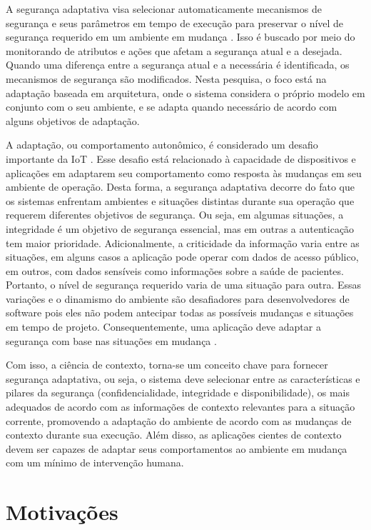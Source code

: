 \documentclass[tid,table]{texufpel} %
\begin{document}
A segurança adaptativa visa selecionar automaticamente mecanismos de segurança e seus parâmetros em tempo de execução para preservar o nível de segurança requerido em um ambiente em mudança \cite{evesti13a}. Isso é buscado  por meio do monitorando de atributos e ações que afetam a segurança atual e a desejada. Quando uma diferença entre a segurança atual e a necessária é identificada, os mecanismos de segurança são modificados. Nesta pesquisa, o foco está na adaptação baseada em arquitetura, onde o sistema considera o próprio modelo em conjunto com o seu ambiente, e se adapta quando necessário de acordo com alguns objetivos de adaptação.

A adaptação, ou comportamento autonômico, é considerado um desafio importante da IoT \cite{aman16, alaba17, gartnerttrends17}. Esse desafio está relacionado à capacidade de dispositivos e aplicações em adaptarem seu comportamento como resposta às mudanças em seu ambiente de operação. Desta forma, a segurança adaptativa decorre do fato que os sistemas enfrentam ambientes e situações distintas durante sua operação que requerem diferentes objetivos de segurança. Ou seja, em algumas situações, a integridade é um objetivo de segurança essencial, mas em outras a autenticação tem maior prioridade. Adicionalmente, a criticidade da informação varia entre as situações, em alguns casos a aplicação pode operar com dados de acesso público, em outros, com dados sensíveis como informações sobre a saúde de pacientes. Portanto, o nível de segurança requerido varia de uma situação para outra. Essas variações e o dinamismo do ambiente são desafiadores para desenvolvedores de software pois eles não podem antecipar todas as possíveis mudanças e situações em tempo de projeto. Consequentemente, uma aplicação deve adaptar a segurança com base nas situações em mudança \cite{evesti13a}.

Com isso, a ciência de contexto, torna-se um conceito chave para fornecer segurança adaptativa, ou seja, o sistema deve selecionar entre as características e pilares da segurança (confidencialidade, integridade e disponibilidade), os mais adequados de acordo com as informações de contexto relevantes para a situação corrente, promovendo a adaptação do ambiente de acordo com as mudanças de contexto durante sua execução. Além disso, as aplicações cientes de contexto devem ser capazes de adaptar seus comportamentos ao ambiente em mudança com um mínimo de intervenção humana.


\section{Motivações}
\end{document}
